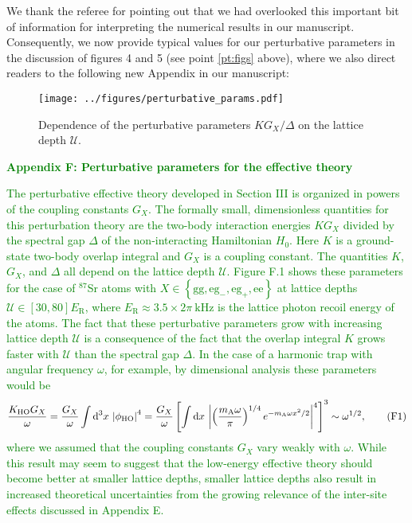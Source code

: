 \documentclass[preprint,showkeys,nofootinbib]{revtex4-1}
\renewcommand{\t}{\text} %
\newcommand{\f}{\dfrac} %
\newcommand{\p}[1]{\left(#1\right)} %
\renewcommand{\sp}[1]{\left[#1\right]} %
\renewcommand{\set}[1]{\left\{#1\right\}} %
\renewcommand{\d}{\text{d}}
\newcommand{\g}{\text{g}}
\newcommand{\e}{\text{e}}
\newcommand{\U}{\mathcal{U}}
\newcommand{\1}{\mathds{1}}
\newcommand{\mA}{m_{\text{A}}} %
\newcommand{\green}[1]{\textcolor{green}{#1}}
\begin{document}
\begin{enumerate}
  \label{pt:pert_params}

  We thank the referee for pointing out that we had overlooked this
  important bit of information for interpreting the numerical results
  in our manuscript.  Consequently, we now provide typical values for
  our perturbative parameters in the discussion of figures 4 and 5
  (see point \ref{pt:figs} above), where we also direct readers to
  the following new Appendix in our manuscript:

  \setcounter{figure}{0}
  \renewcommand\thefigure{F.\arabic{figure}}

  \begin{figure}[b]
    \centering
    \texttt{[image: ../figures/perturbative\_params.pdf]}
    \caption{\footnotesize Dependence of the perturbative parameters
      $KG_X/\Delta$ on the lattice depth $\U$.}
  \end{figure}

  \green{{\bf Appendix F: Perturbative parameters for the effective
      theory}}

  \green{The perturbative effective theory developed in Section III is
    organized in powers of the coupling constants $G_X$.  The formally
    small, dimensionless quantities for this perturbation theory are
    the two-body interaction energies $K G_X$ divided by the spectral
    gap $\Delta$ of the non-interacting Hamiltonian $H_0$.  Here $K$
    is a ground-state two-body overlap integral and $G_X$ is a
    coupling constant.  The quantities $K$, $G_X$, and $\Delta$ all
    depend on the lattice depth $\U$.  Figure F.1 shows these
    parameters for the case of ${}^{87}$Sr atoms with
    $X\in\set{\g\g, \e\g_-, \e\g_+, \e\e}$ at lattice depths
    $\U\in\sp{30,80}E_{\t{R}}$, where
    $E_{\t{R}}\approx3.5\times2\pi~\t{kHz}$ is the lattice photon
    recoil energy of the atoms.  The fact that these perturbative
    parameters grow with increasing lattice depth $\U$ is a
    consequence of the fact that the overlap integral $K$ grows faster
    with $\U$ than the spectral gap $\Delta$.  In the case of a
    harmonic trap with angular frequency $\omega$, for example, by
    dimensional analysis these parameters would be
    \begin{align*}
      \f{K_{\t{HO}} G_X}{\omega}
      = \f{G_X}{\omega} \int \d^3 x~\abs{\phi_{\t{HO}}}^4
      = \f{G_X}{\omega} \sp{\int \d x~
        \abs{\p{\f{\mA\omega}{\pi}}^{1/4} e^{-\mA\omega x^2/2}}^4}^3
      \sim \omega^{1/2},
      \tag{F1}
    \end{align*}
    where we assumed that the coupling constants $G_X$ vary weakly
    with $\omega$.  While this result may seem to suggest that the
    low-energy effective theory should become better at smaller
    lattice depths, smaller lattice depths also result in increased
    theoretical uncertainties from the growing relevance of the
    inter-site effects discussed in Appendix E.}


\end{enumerate}
\end{document}
